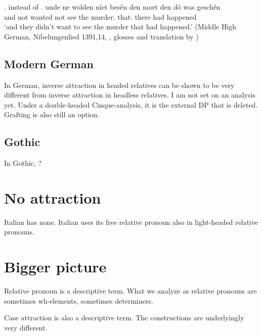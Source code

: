 \ex.  instead of 
\ag. unde ne wolden níet besên den mort den dô was geschên\\
 and not wanted not see the murder. that. there had happened\\
 `and they didn't want to see the murder that had happened.' \hfill (Middle High German, Nibelungenlied 1391,14, \citealt[756]{behaghel1923}, glosses and translation by \citealt[198]{pittner1995})



    \subsection{Modern German}
In German, inverse attraction in headed relatives can be shown to be very different from inverse attraction in headless relatives. I am not set on an analysis yet. Under a double-headed Cinque-analysis, it is the external DP that is deleted. Grafting is also still an option.

    \subsection{Gothic}
In Gothic, ?


\section{No attraction}
Italian has none. Italian uses its free relative pronoun also in light-headed relative pronouns.


  \section{Bigger picture}
Relative pronoun is a descriptive term. What we analyze as relative pronouns are sometimes wh-elements, sometimes determiners.

Case attraction is also a descriptive term. The constructions are underlyingly very different.
